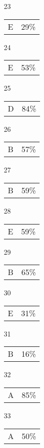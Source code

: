 \documentclass{article}
\begin{document}
\begin{multicols}{4}
\begin{enumerate}
    \item[23] \begin{tabular}{cc} E & 29\%\end{tabular}
    
    \item[24] \begin{tabular}{cc} E & 53\%\end{tabular}
    
    \item[25] \begin{tabular}{cc} D & 84\%\end{tabular}
    
       \item[]
    
    \item[26] \begin{tabular}{cc} B & 57\%\end{tabular}
    
    \item[27] \begin{tabular}{cc} B & 59\%\end{tabular}
    
    \item[28] \begin{tabular}{cc} E & 59\%\end{tabular}
    
    \item[29] \begin{tabular}{cc} B & 65\%\end{tabular}
    
    \item[30] \begin{tabular}{cc} E & 31\%\end{tabular}
    
       \item[]
    
    \item[31] \begin{tabular}{cc} B & 16\%\end{tabular}
    
    \item[32] \begin{tabular}{cc} A & 85\%\end{tabular}
    
    \item[33] \begin{tabular}{cc} A & 50\%\end{tabular}
    

\end{enumerate}
\end{multicols}
\end{document}
